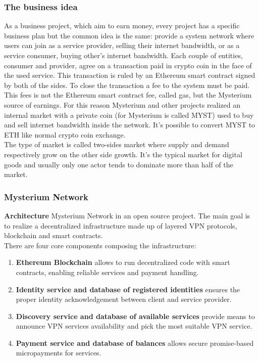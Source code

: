 \documentclass[]{article}
\begin{document}
	\subsubsection{The business idea}
	
	As a business project, which aim to earn money, every project has a specific business plan but the common idea is the same: provide a system network where users can join as a service provider, selling their internet bandwidth, or as a service consumer, buying other's internet bandwidth. Each couple of entities, consumer and provider, agree on a transaction paid in crypto coin in the face of the used service. This transaction is ruled by an Ethereum smart contract signed by both of the sides. To close the transaction a fee to the system must be paid. This fees is not the Ethereum smart contract fee, called gas, but the Mysterium source of earnings. For this reason Mysterium and other projects realized an internal market with a private coin (for Mysterium is called MYST) used to buy and sell internet bandwidth inside the network. It's possible to convert MYST to ETH like normal crypto coin exchange.\\
	The type of market is called two-sides market where supply and demand respectively grow on the other side growth. It's the typical market for digital goods and usually only one actor tends to dominate more than half of the market.
		
	\subsubsection{Mysterium Network}
	
	\textbf{Architecture}
	Mysterium Network in an open source project. The main goal is to realize a decentralized infrastructure made up of layered VPN protocols, blockchain and smart contracts.\\
	There are four core components composing the infrastructure:
	\begin{enumerate}
		\item \textbf{Ethereum Blockchain} allows to run decentralized code with smart contracts, enabling reliable
		services and payment handling.
		\item \textbf{Identity service and database of registered identities} ensures the proper identity
		acknowledgement between client and service provider.
		\item \textbf{Discovery service and database of available services} provide means to announce
		VPN services availability and pick the most suitable VPN service.
		\item \textbf{Payment service and database of balances} allows secure promise-based
		micropayments for services.
	\end{enumerate}
	
\end{document}
